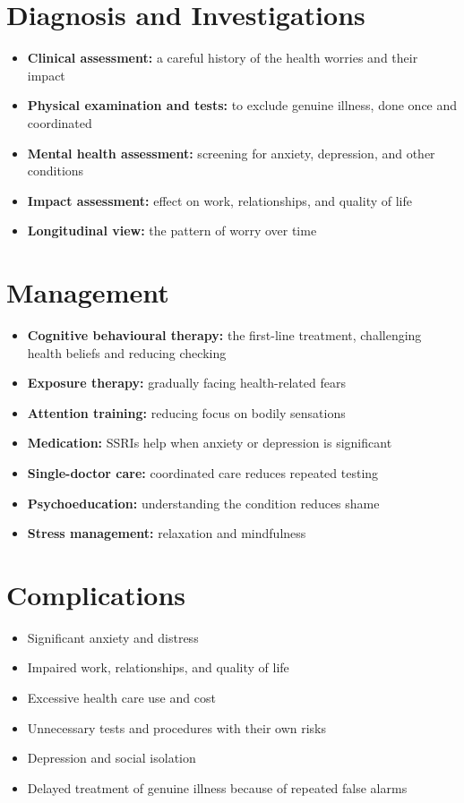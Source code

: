 \section*{Diagnosis and Investigations}
\begin{itemize}
    \item \textbf{Clinical assessment:} a careful history of the health worries and their impact
    \item \textbf{Physical examination and tests:} to exclude genuine illness, done once and coordinated
    \item \textbf{Mental health assessment:} screening for anxiety, depression, and other conditions
    \item \textbf{Impact assessment:} effect on work, relationships, and quality of life
    \item \textbf{Longitudinal view:} the pattern of worry over time
\end{itemize}

\section*{Management}
\begin{itemize}
    \item \textbf{Cognitive behavioural therapy:} the first-line treatment, challenging health beliefs and reducing checking
    \item \textbf{Exposure therapy:} gradually facing health-related fears
    \item \textbf{Attention training:} reducing focus on bodily sensations
    \item \textbf{Medication:} SSRIs help when anxiety or depression is significant
    \item \textbf{Single-doctor care:} coordinated care reduces repeated testing
    \item \textbf{Psychoeducation:} understanding the condition reduces shame
    \item \textbf{Stress management:} relaxation and mindfulness
\end{itemize}

\section*{Complications}
\begin{itemize}
    \item Significant anxiety and distress
    \item Impaired work, relationships, and quality of life
    \item Excessive health care use and cost
    \item Unnecessary tests and procedures with their own risks
    \item Depression and social isolation
    \item Delayed treatment of genuine illness because of repeated false alarms
\end{itemize}

